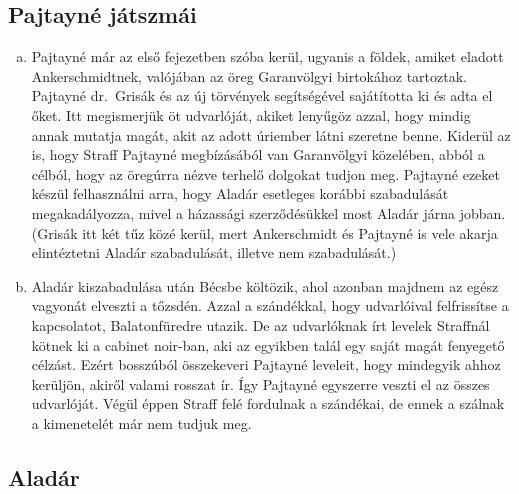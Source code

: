 \documentclass{thesis-ekf}
\theoremstyle{definition}
\begin{document}
    \subsection{Pajtayné játszmái}

    \begin{enumerate}[a)]
        \item\label{itm:Corinna-udvarlok} Pajtayné már az első fejezetben szóba kerül, ugyanis a földek, amiket eladott
            Ankerschmidtnek, valójában az öreg Garanvölgyi birtokához tartoztak.
        Pajtayné dr.~Grisák és az új törvények segítségével sajátította ki és adta el őket.
        Itt megismerjük öt udvarlóját, akiket lenyűgöz azzal, hogy mindig annak mutatja magát,
            akit az adott úriember látni szeretne benne.
        Kiderül az is, hogy Straff Pajtayné megbízásából van Garanvölgyi közelében, abból a célból,
            hogy az öregúrra nézve terhelő dolgokat tudjon meg.
        Pajtayné ezeket készül felhasználni arra, hogy Aladár esetleges korábbi szabadulását megakadályozza,
            mivel a házassági szerződésükkel most Aladár járna jobban.
        (Grisák itt két tűz közé kerül, mert Ankerschmidt és Pajtayné is vele akarja elintéztetni Aladár szabadulását,
            illetve nem szabadulását.)
        \item\label{itm:Corinna-Bfured} Aladár kiszabadulása után Bécsbe költözik, ahol azonban majdnem az egész vagyonát elveszti a tőzsdén.
        Azzal a szándékkal, hogy udvarlóival felfrissítse a kapcsolatot, Balatonfüredre utazik.
        De az udvarlóknak írt levelek Straffnál kötnek ki a cabinet noir-ban, aki az egyikben talál egy saját magát fenyegető célzást.
        Ezért bosszúból összekeveri Pajtayné leveleit, hogy mindegyik ahhoz kerüljön, akiről valami rosszat ír.
        Így Pajtayné egyszerre veszti el az összes udvarlóját.
        Végül éppen Straff felé fordulnak a szándékai, de ennek a szálnak a kimenetelét már nem tudjuk meg.
    \end{enumerate}

    \subsection{Aladár}
\end{document}
